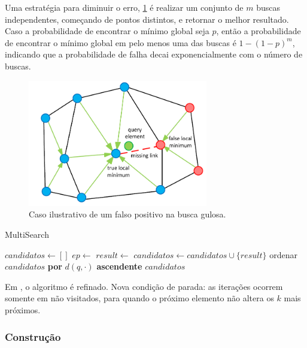 Uma estratégia para diminuir o erro, \cref{fig:nsw_falsepositive} é realizar um conjunto de $m$ buscas independentes, começando de pontos distintos, e retornar o melhor resultado. Caso a probabilidade de encontrar o mínimo global seja $p$, então a probabilidade de encontrar o mínimo global em pelo menos uma das buscas é $1 - (1 - p)^m$, indicando que a probabilidade de falha decai exponencialmente com o número de buscas.

\begin{figure}
    \centering
    \includegraphics[width=0.7\textwidth]{imgs/nsw_falsepositive.png}
    \caption{Caso ilustrativo de um falso positivo na busca gulosa.}
    \label{fig:nsw_falsepositive}
\end{figure}

\begin{algorithm}
\caption{MultiSearch}
\begin{algorithmic}[1]
    \State $candidatos \gets []$
        \State $ep \gets$ 
        \State $result \gets$ 
        \State $candidatos \gets candidatos \cup \{result\}$
    \EndFor
    \State ordenar $candidatos$ \textbf{por} $d(q, \cdot)$ \textbf{ascendente}
    \State \Return $candidatos$
\EndProcedure
\end{algorithmic}
\end{algorithm}

Em \cite{smallworldgraphs:malkov2014}, o algoritmo é refinado. Nova condição de parada: as iterações ocorrem somente em não visitados, para quando o próximo elemento não altera os $k$ mais próximos.

\subsubsection{Construção}

